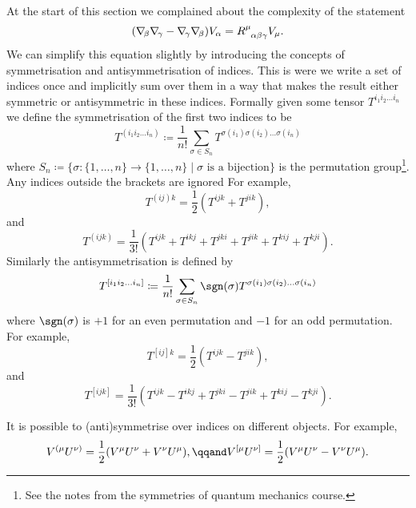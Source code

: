At the start of this section we complained about the complexity of the statement
\begin{equation}
    (\covariantDerivative{\beta}\covariantDerivative{\gamma} - \covariantDerivative{\gamma}\covariantDerivative{\beta})V_\alpha = \tensor{R}{^\mu_{\alpha\beta\gamma}}V_\mu.
\end{equation}
We can simplify this equation slightly by introducing the concepts of symmetrisation and antisymmetrisation of indices.
This is were we write a set of indices once and implicitly sum over them in a way that makes the result either symmetric or antisymmetric in these indices.
Formally given some tensor \(T^{i_1i_2\dotso i_n}\) we define the symmetrisation of the first two indices to be
\begin{equation}
    T^{(i_1i_2\dotso i_n)} \coloneqq \frac{1}{n!}\sum_{\sigma \in S_n} T^{\sigma(i_1)\sigma(i_2) \dotso \sigma(i_n)}
\end{equation}
where \(S_n \coloneqq \{\sigma \colon \{1, \dotsc, n\} \to \{1, \dotsc, n\} \mid \sigma \text{ is a bijection}\}\) is the permutation group\footnote{See the notes from the symmetries of quantum mechanics course.}.
Any indices outside the brackets are ignored
For example,
\begin{equation}
    T^{(ij)k} = \frac{1}{2}(T^{ijk} + T^{jik}),
\end{equation}
and
\begin{equation}
    T^{(ijk)} = \frac{1}{3!} (T^{ijk} + T^{ikj} + T^{jki} + T^{jik} + T^{kij} + T^{kji}).
\end{equation}
Similarly the antisymmetrisation is defined by
\begin{equation}
    T^{[i_1i_2\dotso i_n]} \coloneqq \frac{1}{n!}\sum_{\sigma \in S_n} \sgn(\sigma) T^{\sigma(i_1)\sigma(i_2)\dotso \sigma(i_n)}
\end{equation}
where \(\sgn(\sigma)\) is \(+1\) for an even permutation and \(-1\) for an odd permutation.
For example,
\begin{equation}
    T^{[ij]k} = \frac{1}{2}(T^{ijk} - T^{jik}),
\end{equation}
and
\begin{equation}
    T^{[ijk]} = \frac{1}{3!}(T^{ijk} - T^{ikj} + T^{jki} - T^{jik} + T^{kij} - T^{kji}).
\end{equation}

It is possible to (anti)symmetrise over indices on different objects.
For example,
\begin{equation}
    V^{(\mu}U^{\nu)} = \frac{1}{2}(V^\mu U^\nu + V^\nu U^\mu), \qqand V^{[\mu}U^{\nu]} = \frac{1}{2}(V^\mu U^\nu - V^\nu U^\mu).
\end{equation}

